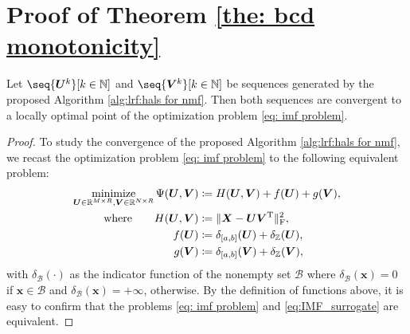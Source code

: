 \section{Proof of Theorem \ref{the: bcd monotonicity}} \label{app: proof}

\begin{theorem}
    Let $\seq{\bm U^k}[k\in\N]$ and $\seq{\bm V^k}[k\in\N]$ be sequences generated by the proposed Algorithm \ref{alg:lrf:hals for nmf}. Then both sequences are convergent to a locally optimal point of the optimization problem \eqref{eq: imf problem}.
\end{theorem}

\begin{proof}
    To study the convergence of the proposed Algorithm \ref{alg:lrf:hals for nmf}, we recast the optimization problem \eqref{eq: imf problem} to the following equivalent problem:
    \begin{align}
        \begin{split}
            \operatorname*{minimize}_{\bm U \in \mathbb{R}^{M\times R}, \bm V \in \mathbb{R}^{N\times R}} \Psi(\bm U, \bm V) &\coloneqq H(\bm U, \bm V) + f(\bm U) + g(\bm V),\\
            \text{where} \quad~~~ H(\bm U, \bm V) &\coloneqq \|\bm X - \bm U \bm V^{\rm T} \|_{\rm F}^2,\\
            f(\bm U) &\coloneqq \delta_{[a,b]}(\bm U) + \delta_\mathbb Z(\bm U),\\
            g(\bm V) &\coloneqq \delta_{[a,b]}(\bm V) + \delta_\mathbb Z(\bm V),
        \end{split}
        \label{eq:IMF_surrogate}
    \end{align}
    with $\delta_\mathcal{B}(\cdot)$ as the indicator function of the nonempty set $\mathcal{B}$ where $\delta_\mathcal{B}(\bm x) = 0$ if $\bm x \in \mathcal{B}$ and $\delta_\mathcal{B}(\bm x) = +\infty$, otherwise. By the definition of functions above, it is easy to confirm that the problems \eqref{eq: imf problem} and \eqref{eq:IMF_surrogate} are equivalent.
    

\end{proof}

